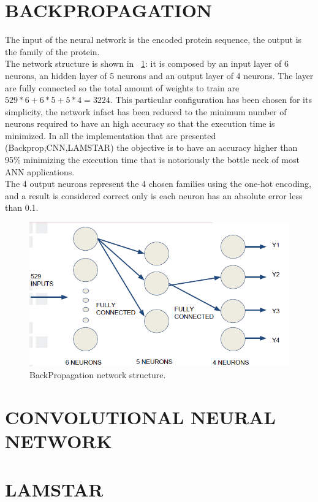 \documentclass[a4paper, 10pt, conference]{ieeeconf}      %
\begin{document}
\section{BACKPROPAGATION}\label{sec:bp}
	The input of the neural network is the encoded protein sequence, the output is the family of the protein.\\
	The network structure is shown in ~\ref{bp}: it is composed by an input layer of 6 neurons, an hidden layer of 5 neurons and an output layer of 4 neurons. The layer are fully connected so the total amount of weights to train are $529*6 + 6*5 + 5*4=3224$. This particular configuration has been chosen for its simplicity, the network infact has been reduced to the minimum number of neurons required to have an high accuracy so that the execution time is minimized. In all the implementation that are presented (Backprop,CNN,LAMSTAR) the objective is to have an accuracy higher than 95\% minimizing the execution time that is notoriously the bottle neck of most ANN applications.\\
	The 4 output neurons represent the 4 chosen families using the one-hot encoding, and a result is considered correct only is each neuron has an absolute error less than 0.1.\\
	\begin{figure}[thpb]
		\centering
		\includegraphics[scale=0.6]{bp.png}
		\caption{BackPropagation network structure.}
		\label{bp}
	\end{figure}

\section{CONVOLUTIONAL NEURAL NETWORK}\label{sec:cnn}
\section{LAMSTAR}\label{sec:lamstar}
\end{document}

